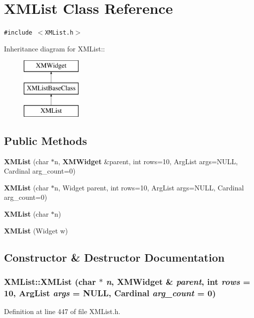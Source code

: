 \section{XMList  Class Reference}
\label{classXMList}
{\tt \#include $<$XMList.h$>$}

Inheritance diagram for XMList::\begin{figure}[H]
\begin{center}
\leavevmode
\includegraphics[height=3cm]{classXMList}
\end{center}
\end{figure}
\subsection*{Public Methods}
\begin{CompactItemize}
\item 
{\bf XMList} (char $\ast$n, {\bf XMWidget} \&parent, int rows=10, Arg\-List args=NULL, Cardinal arg\_\-count=0)
\item 
{\bf XMList} (char $\ast$n, Widget parent, int rows=10, Arg\-List args=NULL, Cardinal arg\_\-count=0)
\item 
{\bf XMList} (char $\ast$n)
\item 
{\bf XMList} (Widget w)
\end{CompactItemize}


\subsection{Constructor \& Destructor Documentation}
\subsubsection{\setlength{\rightskip}{0pt plus 5cm}XMList::XMList (char $\ast$ {\em n}, {\bf XMWidget} \& {\em parent}, int {\em rows} = 10, Arg\-List {\em args} = NULL, Cardinal {\em arg\_\-count} = 0)\hspace{0.3cm}{\tt  [inline]}}\label{classXMList_a0}




Definition at line 447 of file XMList.h.


